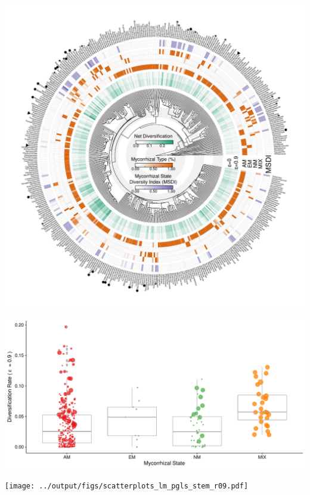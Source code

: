 \documentclass[
  12pt,
]{article}
\begin{document}
\includegraphics{../output/tree_fig/phylo_genus_final_resized.pdf}

\newpage

\includegraphics{../output/figs/boxplots_netdiv_myctype_r09.pdf}

\newpage

\texttt{[image: ../output/figs/scatterplots\_lm\_pgls\_stem\_r09.pdf]}
\end{document}
